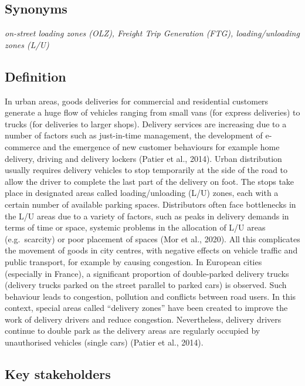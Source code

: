 \documentclass[
]{book}
\begin{document}
\hypertarget{synonyms-29}{%
\subsection*{Synonyms}\label{synonyms-29}}

\emph{on-street loading zones (OLZ), Freight Trip Generation (FTG), loading/unloading zones (L/U) }

\hypertarget{definition-32}{%
\subsection*{Definition}\label{definition-32}}

In urban areas, goods deliveries for commercial and residential customers generate a huge flow of vehicles ranging from small vans (for express deliveries) to trucks (for deliveries to larger shops). Delivery services are increasing due to a number of factors such as just-in-time management, the development of e-commerce and the emergence of new customer behaviours for example home delivery, driving and delivery lockers (Patier et al., 2014).
Urban distribution usually requires delivery vehicles to stop temporarily at the side of the road to allow the driver to complete the last part of the delivery on foot. The stops take place in designated areas called loading/unloading (L/U) zones, each with a certain number of available parking spaces. Distributors often face bottlenecks in the L/U areas due to a variety of factors, such as peaks in delivery demands in terms of time or space, systemic problems in the allocation of L/U areas (e.g.~scarcity) or poor placement of spaces (Mor et al., 2020).
All this complicates the movement of goods in city centres, with negative effects on vehicle traffic and public transport, for example by causing congestion. In European cities (especially in France), a significant proportion of double-parked delivery trucks (delivery trucks parked on the street parallel to parked cars) is observed. Such behaviour leads to congestion, pollution and conflicts between road users. In this context, special areas called ``delivery zones'' have been created to improve the work of delivery drivers and reduce congestion. Nevertheless, delivery drivers continue to double park as the delivery areas are regularly occupied by unauthorised vehicles (single cars) (Patier et al., 2014).

\hypertarget{key-stakeholders-32}{%
\subsection*{Key stakeholders}\label{key-stakeholders-32}}
\end{document}
